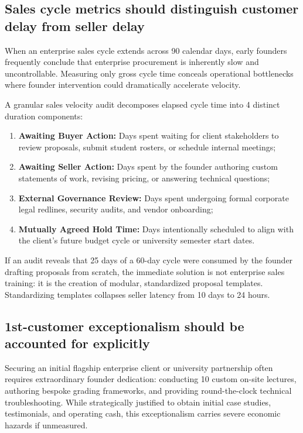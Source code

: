 \subsection{Sales cycle metrics should distinguish customer delay from seller delay}

When an enterprise sales cycle extends across 90 calendar days, early founders frequently conclude that enterprise procurement is inherently slow and uncontrollable. Measuring only gross cycle time conceals operational bottlenecks where founder intervention could dramatically accelerate velocity.

A granular sales velocity audit decomposes elapsed cycle time into 4 distinct duration components:
\begin{enumerate}
\item \textbf{Awaiting Buyer Action:} Days spent waiting for client stakeholders to review proposals, submit student rosters, or schedule internal meetings;
\item \textbf{Awaiting Seller Action:} Days spent by the founder authoring custom statements of work, revising pricing, or answering technical questions;
\item \textbf{External Governance Review:} Days spent undergoing formal corporate legal redlines, security audits, and vendor onboarding;
\item \textbf{Mutually Agreed Hold Time:} Days intentionally scheduled to align with the client's future budget cycle or university semester start dates.
\end{enumerate}
If an audit reveals that 25 days of a 60-day cycle were consumed by the founder drafting proposals from scratch, the immediate solution is not enterprise sales training: it is the creation of modular, standardized proposal templates. Standardizing templates collapses seller latency from 10 days to 24 hours.

\subsection{1st-customer exceptionalism should be accounted for explicitly}

Securing an initial flagship enterprise client or university partnership often requires extraordinary founder dedication: conducting 10 custom on-site lectures, authoring bespoke grading frameworks, and providing round-the-clock technical troubleshooting. While strategically justified to obtain initial case studies, testimonials, and operating cash, this exceptionalism carries severe economic hazards if unmeasured.

